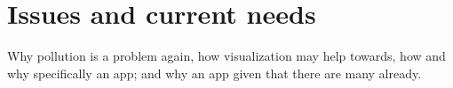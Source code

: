 \section{Issues and current needs}
Why pollution is a problem again, how visualization may help towards, how and why specifically an app; and why an app given that there are many already. 